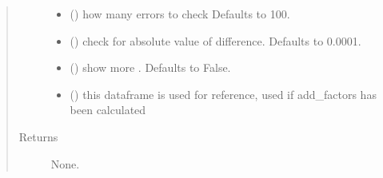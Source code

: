 \documentclass[letterpaper,10pt,english]{sphinxmanual}
\begin{document}
\begin{fulllineitems}
\begin{fulllineitems}
\begin{quote}
\begin{description}
\begin{itemize}
\item {} 
\sphinxAtStartPar
{} (\sphinxstyleliteralemphasis{\sphinxupquote{, }}) \textendash{} how many errors to check Defaults to 100.

\item {} 
\sphinxAtStartPar
{} (\sphinxstyleliteralemphasis{\sphinxupquote{, }}) \textendash{} check for absolute value of difference. Defaults to 0.0001.

\item {} 
\sphinxAtStartPar
{} (\sphinxstyleliteralemphasis{\sphinxupquote{, }}) \textendash{} show more . Defaults to False.

\item {} 
\sphinxAtStartPar
{} (\sphinxstyleliteralemphasis{\sphinxupquote{, }}) \textendash{} this dataframe is used for reference, used if add\_factors has been calculated

\end{itemize}

\item[{Returns}] \leavevmode
\sphinxAtStartPar
None.

\end{description}\end{quote}

\end{fulllineitems}


\end{fulllineitems}

\end{document}
